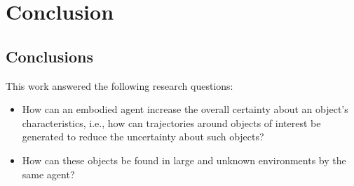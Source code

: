     
    
    





\chapter{Conclusion}\label{chap:conclusion}
\section{Conclusions}\label{sec:conclusions}
    This work answered the following research questions:
    \begin{itemize}
      \item How can an embodied agent increase the overall certainty about an object's characteristics, i.e., how can trajectories around objects of interest be generated to reduce the uncertainty about such objects? 
      \item How can these objects be found in large and unknown environments by the same agent?
    \end{itemize}
   
